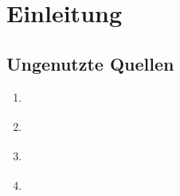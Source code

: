 \chapter{Einleitung}

\section*{Ungenutzte Quellen}
\begin{enumerate}
	\item \cite{BASISWISSEN_SOFTWAETEST}
	\item \cite[20ff]{DER_INTEGRATIONSTEST}
	\item \cite{MODELLGETRIEBENE_SOFTWAREENTWICKLUNG}
	\item \cite{DOMAIN_DRIVEN_DESIGN}
\end{enumerate}
